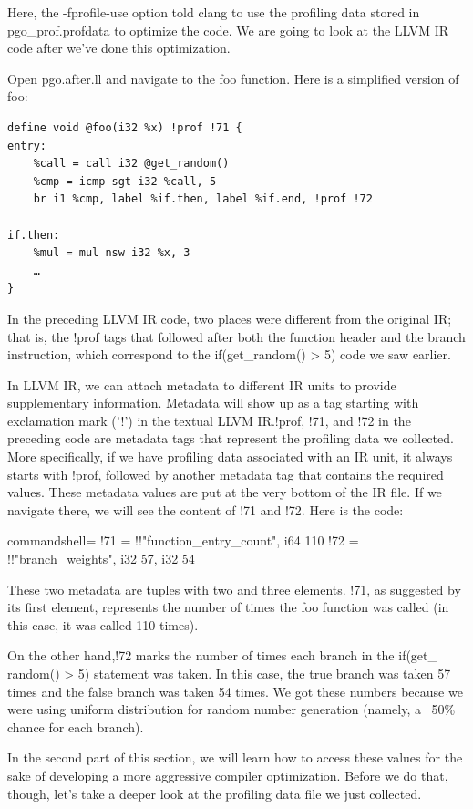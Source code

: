 Here, the -fprofile-use option told clang to use the profiling data stored in pgo\_prof.profdata to optimize the code. We are going to look at the LLVM IR code after we've done this optimization.

Open pgo.after.ll and navigate to the foo function. Here is a simplified version
of foo:

\begin{lstlisting}[style=styleCXX]
define void @foo(i32 %x) !prof !71 {
entry:
	%call = call i32 @get_random()
	%cmp = icmp sgt i32 %call, 5
	br i1 %cmp, label %if.then, label %if.end, !prof !72
	
if.then:
	%mul = mul nsw i32 %x, 3
	…
}
\end{lstlisting}

In the preceding LLVM IR code, two places were different from the original IR; that is, the !prof tags that followed after both the function header and the branch instruction, which correspond to the if(get\_random() > 5) code we saw earlier.

In LLVM IR, we can attach metadata to different IR units to provide supplementary information. Metadata will show up as a tag starting with exclamation mark ('!') in the textual LLVM IR.!prof, !71, and !72 in the preceding code are metadata tags that represent the profiling data we collected. More specifically, if we have profiling data associated with an IR unit, it always starts with !prof, followed by another metadata tag that contains the required values. These metadata values are put at the very bottom of the IR file. If we navigate there, we will see the content of !71 and !72. Here is the code:

\begin{tcblisting}{commandshell={}}
!71 = !{!"function_entry_count", i64 110}
!72 = !{!"branch_weights", i32 57, i32 54}
\end{tcblisting}

These two metadata are tuples with two and three elements. !71, as suggested by its first element, represents the number of times the foo function was called (in this case, it was called 110 times).

On the other hand,!72 marks the number of times each branch in the if(get\_ random() > 5) statement was taken. In this case, the true branch was taken 57 times and the false branch was taken 54 times. We got these numbers because we were using uniform distribution for random number generation (namely, a ~50\% chance for each branch).

In the second part of this section, we will learn how to access these values for the sake of developing a more aggressive compiler optimization. Before we do that, though, let's take a deeper look at the profiling data file we just collected.

